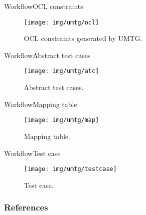\documentclass[10pt]{beamer}
\newcommand{\1}{
        	\setbeamertemplate{background}{
        		\texttt{[image: img/1]}
        		\tikz[overlay] \fill[fill opacity=0.75,fill=white] (0,0) rectangle (-\paperwidth,\paperheight);
        	}
}
\begin{document}
\begin{frame}{Workflow}{OCL constraints}	
	\begin{figure}
		\centering
		\texttt{[image: img/umtg/ocl]}
		\caption{OCL constraints generated by UMTG.}
	\end{figure}	
\end{frame}

\begin{frame}{Workflow}{Abstract test cases}	
	\begin{figure}
		\centering
		\texttt{[image: img/umtg/atc]}
		\caption{Abstract test cases.}
	\end{figure}	
\end{frame}

\begin{frame}{Workflow}{Mapping table}	
	\begin{figure}
		\centering
		\texttt{[image: img/umtg/map]}
		\caption{Mapping table.}
	\end{figure}	
\end{frame}

\begin{frame}{Workflow}{Test case}	
	\begin{figure}
		\centering
		\texttt{[image: img/umtg/testcase]}
		\caption{Test case.}
	\end{figure}	
\end{frame}


\begin{frame}[allowframebreaks]
	\frametitle{References}
	
	
\end{frame}
\end{document}
